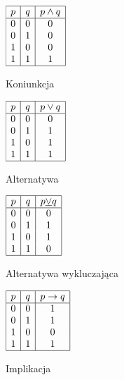 \documentclass{SGGW-thesis}
\begin{document}
\begin{table}[h]
\vspace{1cm}

\parbox{.45\linewidth}{
    \centering

    $\begin{array}{|c|c|c|}
        \hline
        p & q & p \wedge q \\
        \hline
        0 & 0 & 0 \\
        0 & 1 & 0 \\
        1 & 0 & 0 \\
        1 & 1 & 1 \\
        \hline
    \end{array}$
    \caption{Koniunkcja}
}
\parbox{.45\linewidth}{
    \centering

    $\begin{array}{|c|c|c|}
        \hline
        p & q & p \vee q \\
        \hline
        0 & 0 & 0 \\
        0 & 1 & 1 \\
        1 & 0 & 1 \\
        1 & 1 & 1 \\
        \hline
    \end{array}$
    \caption{Alternatywa}
}

\vspace{1cm}

\parbox{.45\linewidth}{
    \centering

    $\begin{array}{|c|c|c|}
        \hline
        p & q & p \underline{\vee} q \\
        \hline
        0 & 0 & 0 \\
        0 & 1 & 1 \\
        1 & 0 & 1 \\
        1 & 1 & 0 \\
        \hline
    \end{array}$
    \caption{Alternatywa wykluczająca}
}
\parbox{.45\linewidth}{
    \centering

    $\begin{array}{|c|c|c|}
        \hline
        p & q & p \rightarrow q \\
        \hline
        0 & 0 & 1 \\
        0 & 1 & 1 \\
        1 & 0 & 0 \\
        1 & 1 & 1 \\
        \hline
    \end{array}$
    \caption{Implikacja}
}


\end{table}
\end{document}
